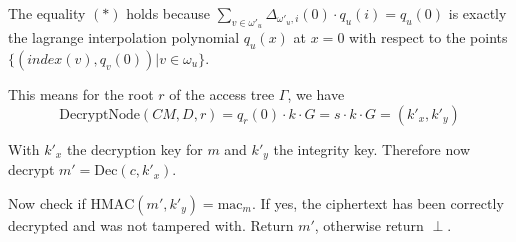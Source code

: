 The equality $(*)$ holds because $\sum_{v \in \omega'_u} \Delta_{\omega'_u, i}(0) \cdot q_u(i) = q_u(0)$ is exactly the lagrange interpolation polynomial $q_u(x)$ at $x = 0$ with respect to the points $\{(index(v), q_v(0)) | v \in \omega_u\}$. 

This means for the root $r$ of the access tree $\Gamma$, we have
\begin{equation*}
    \text{DecryptNode}(CM, D, r) =  q_r(0) \cdot k \cdot G = s \cdot k \cdot G = (k'_x, k'_y)
\end{equation*}

With $k'_x$ the decryption key for $m$ and $k'_y$ the integrity key. Therefore now decrypt $m' = \text{Dec}(c, k'_x)$.

Now check if $\text{HMAC}(m', k'_y) = \text{mac}_m$. If yes, the ciphertext has been correctly decrypted and was not tampered with. Return $m'$, otherwise return $\perp$.